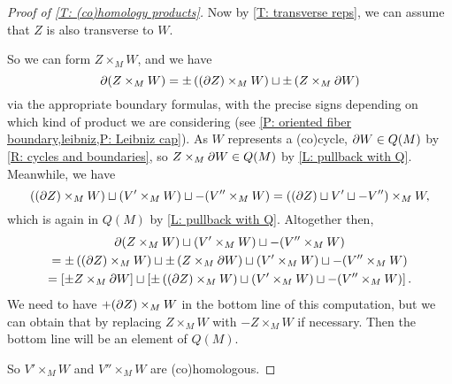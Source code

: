 \begin{proof}[Proof of \cref{T: (co)homology products}]
	Now by \cref{T: transverse reps}, we can assume that $Z$ is also transverse to $W$.
	\begin{comment}
		 To do so, we claim we can find a proper universal homotopy $H \colon Z \times I \to M$ from $r_Z$ to an $r_Z':Z' \to M$ with $Z = Z'$ such that the restrictions of $H$ to $V' \times I$ and $V'' \times I$ are transverse to $r_W$ and $r_Z'$ is also transverse to $r_W$.
		We will prove this is possible in \cref{P: perturb transverse to map}.
		Then $H|_{V' \times I}$ and $H|_{V'' \times I}$ give (co)homologies from the (co)chains represented by $V'$ and $V''$ to (co)chains that are (co)homologous to each other via $r_Z'$.
		Altogether, this gives a (co)homology from $V'$ to $V''$ via maps that are transverse to $r_W$.
		Call the (co)chain representing this last (co)homology $\mc V$ so that $(\bd \mc V) \sqcup V' \sqcup -V'' \in Q(M)$ and $\mc V$ is transverse to $W$.
	\end{comment}
	So we can form $Z \times_M W$, and we have $$\partial (Z \times_M W) = \pm \left( (\partial Z) \times_M W \right) \sqcup \pm \left( Z \times_M \partial W \right)$$ via the appropriate boundary formulas, with the precise signs depending on which kind of product we are considering (see \cref{P: oriented fiber boundary,leibniz,P: Leibniz cap}).
	As $W$ represents a (co)cycle, $\partial W \in Q(M)$ by \cref{R: cycles and boundaries}, so $Z \times_M \partial W \in Q(M)$ by \cref{L: pullback with Q}.
	Meanwhile, we have
	$$((\partial Z) \times_M W) \sqcup (V' \times_M W) \sqcup -(V'' \times_M W) = \left((\partial Z) \sqcup V' \sqcup -V''\right) \times_M W,$$
	which is again in $Q(M)$ by \cref{L: pullback with Q}.
	Altogether then,
	\begin{multline*}
	\partial (Z \times_M W)  \sqcup (V' \times_M W) \sqcup -(V'' \times_M W)\\
	  = \pm \left( (\partial Z) \times_M W \right) \sqcup \pm \left( Z \times_M \partial W \right) \sqcup (V' \times_M W) \sqcup -(V'' \times_M W)\\
	 = \left[\pm Z \times_M \partial W\right] \sqcup \left[ \pm \left((\partial Z) \times_M W \right) \sqcup (V' \times_M W) \sqcup -(V'' \times_M W)\right].
	\end{multline*}
	We need to have $+(\partial Z) \times_M W$ in the bottom line of this computation, but we can obtain that by replacing $Z \times_M W$ with $-Z \times_M W$ if necessary.
	Then the bottom line will be an element of $Q(M)$.

	So $V' \times_M W$ and $V'' \times_M W$ are (co)homologous.
	\qedhere
	\begin{comment}
		To finish the proof, we need an analogue of \cref{P: ball stability} that allows us to construct the homotopy $H$.
		This is the content of \cref{P: perturb transverse to map} below.
	\end{comment}
\end{proof}

